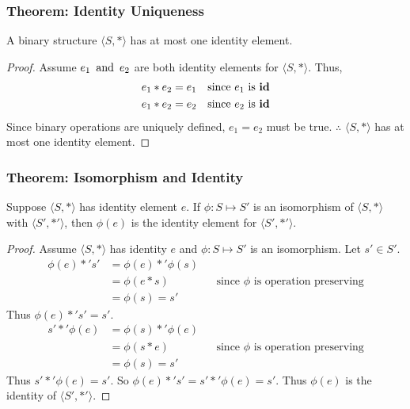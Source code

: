\subsubsection*{Theorem: Identity Uniqueness}
A binary structure $\langle S, * \rangle$ has at most one identity element.

\begin{proof}
    Assume $e_1 \operatorname{~\text{and}~} e_2$ are both identity elements for $\langle S, * \rangle$. Thus,
    \begin{align*}
        e_1 * e_2 & = e_1 &  & \text{since $e_1$ is $\operatorname{\textbf{id}}$} \\
        e_1 * e_2 & = e_2 &  & \text{since $e_2$ is $\operatorname{\textbf{id}}$}
    \end{align*}
    Since binary operations are uniquely defined, $e_1 = e_2$ must be true.
    $\therefore$ $\langle S, * \rangle$ has at most one identity element.
\end{proof}

\subsubsection*{Theorem: Isomorphism and Identity}
Suppose $\langle S, * \rangle$ has identity element $e$. If $\phi: S \mapsto S'$ is an isomorphism of $\langle S, * \rangle$ with $\langle S', *' \rangle$, then $\phi(e)$ is the identity element for $\langle S', *' \rangle$.

\begin{proof}
    Assume $\langle S, * \rangle$ has identity $e$ and $\phi: S \mapsto S'$ is an isomorphism. Let $s' \in S'$.
    \begin{align*}
        \phi(e) *' s' & = \phi(e) *' \phi(s)                                                  \\
                      & = \phi(e * s)        &  & \text{since $\phi$ is operation preserving} \\
                      & = \phi(s) = s'
    \end{align*}
    Thus $\phi(e) *' s' = s'$.
    \begin{align*}
        s' *' \phi(e) & = \phi(s) *' \phi(e)                                                  \\
                      & = \phi(s * e)        &  & \text{since $\phi$ is operation preserving} \\
                      & = \phi(s) = s'
    \end{align*}
    Thus $s' *' \phi(e) = s'$. So $\phi(e) *' s' = s' *' \phi(e) = s'$. Thus $\phi(e)$ is the identity of $\langle S', *' \rangle$.
\end{proof}

